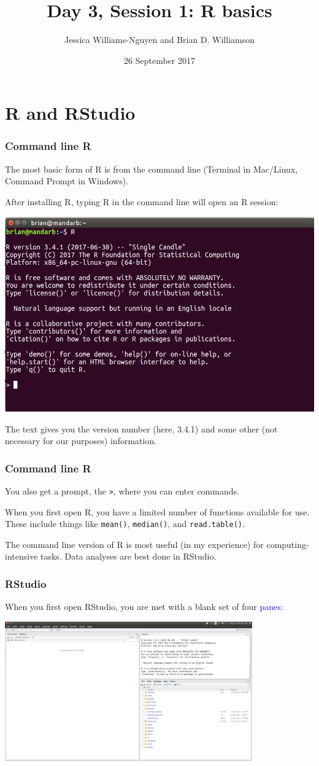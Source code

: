 \documentclass[11pt]{beamer}
\title{Day 3, Session 1: R basics}
\author{Jessica Williams-Nguyen and Brian D. Williamson}
\institute{EPI/BIOST Bootcamp 2017}
\date{26 September 2017}
\newcommand{\myframe}[1]{\begin{frame} \frametitle{#1}}
\begin{document}
\begin{frame}
\titlepage
\end{frame}

\section{R and RStudio}
\myframe{Command line R}
The most basic form of R is from the command line (Terminal in Mac/Linux, Command Prompt in Windows). 

After installing R, typing R in the command line will open an R session:
\begin{center}
\includegraphics[width = .6\textwidth]{figs/command_line_r.png}
\end{center}

The text gives you the version number (here, 3.4.1) and some other (not necessary for our purposes) information. 
\end{frame}

\myframe{Command line R}
You also get a prompt, the \texttt{>}, where you can enter commands. 

When you first open R, you have a limited number of functions available for use. These include things like \texttt{mean()}, \texttt{median()}, and \texttt{read.table()}. 

The command line version of R is most useful (in my experience) for computing-intensive tasks. Data analyses are best done in RStudio.
\end{frame}

\myframe{RStudio}
When you first open RStudio, you are met with a blank set of four \textcolor{blue}{panes}:
\begin{center}
\includegraphics[width = 0.8\textwidth]{figs/rstudio.png}
\end{center}
\end{frame}
\end{document}
